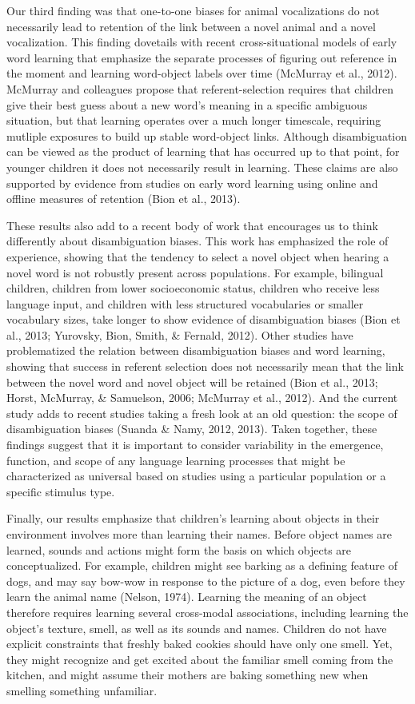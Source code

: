 \documentclass[english,floatsintext,man]{apa6}
\theoremstyle{definition}
\theoremstyle{definition}
\theoremstyle{definition}
\theoremstyle{remark}
\begin{document}
Our third finding was that one-to-one biases for animal vocalizations do
not necessarily lead to retention of the link between a novel animal and
a novel vocalization. This finding dovetails with recent
cross-situational models of early word learning that emphasize the
separate processes of figuring out reference in the moment and learning
word-object labels over time (McMurray et al., 2012). McMurray and
colleagues propose that referent-selection requires that children give
their best guess about a new word's meaning in a specific ambiguous
situation, but that learning operates over a much longer timescale,
requiring mutliple exposures to build up stable word-object links.
Although disambiguation can be viewed as the product of learning that
has occurred up to that point, for younger children it does not
necessarily result in learning. These claims are also supported by
evidence from studies on early word learning using online and offline
measures of retention (Bion et al., 2013).

These results also add to a recent body of work that encourages us to
think differently about disambiguation biases. This work has emphasized
the role of experience, showing that the tendency to select a novel
object when hearing a novel word is not robustly present across
populations. For example, bilingual children, children from lower
socioeconomic status, children who receive less language input, and
children with less structured vocabularies or smaller vocabulary sizes,
take longer to show evidence of disambiguation biases (Bion et al.,
2013; Yurovsky, Bion, Smith, \& Fernald, 2012). Other studies have
problematized the relation between disambiguation biases and word
learning, showing that success in referent selection does not
necessarily mean that the link between the novel word and novel object
will be retained (Bion et al., 2013; Horst, McMurray, \& Samuelson,
2006; McMurray et al., 2012). And the current study adds to recent
studies taking a fresh look at an old question: the scope of
disambiguation biases (Suanda \& Namy, 2012, 2013). Taken together,
these findings suggest that it is important to consider variability in
the emergence, function, and scope of any language learning processes
that might be characterized as universal based on studies using a
particular population or a specific stimulus type.

Finally, our results emphasize that children's learning about objects in
their environment involves more than learning their names. Before object
names are learned, sounds and actions might form the basis on which
objects are conceptualized. For example, children might see barking as a
defining feature of dogs, and may say bow-wow in response to the picture
of a dog, even before they learn the animal name (Nelson, 1974).
Learning the meaning of an object therefore requires learning several
cross-modal associations, including learning the object's texture,
smell, as well as its sounds and names. Children do not have explicit
constraints that freshly baked cookies should have only one smell. Yet,
they might recognize and get excited about the familiar smell coming
from the kitchen, and might assume their mothers are baking something
new when smelling something unfamiliar.
\end{document}
